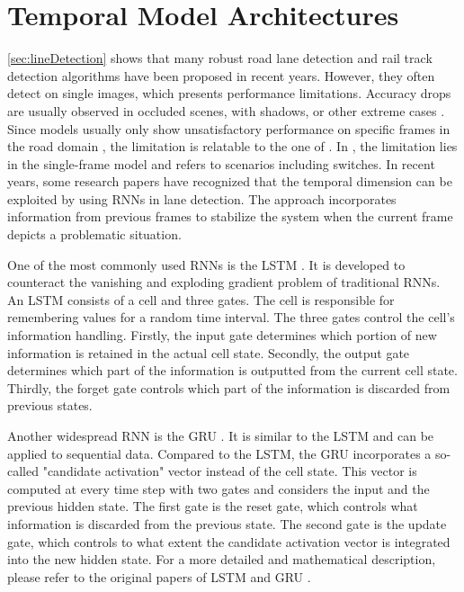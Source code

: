 \section{Temporal Model Architectures}
\label{sec:temporalModelArchitecture}

\autoref{sec:lineDetection} shows that many robust road lane detection and rail track detection algorithms have been proposed in recent years.
However, they often detect on single images, which presents performance limitations.
Accuracy drops are usually observed in occluded scenes, with shadows, or other extreme cases \cite{robustLaneDetection2020}.
Since models usually only show unsatisfactory performance on specific frames in the road domain \cite{robustLaneDetection2020}, the limitation is relatable to the one of \cite{tepNet2024}.
In \cite{tepNet2024}, the limitation lies in the single-frame model and refers to scenarios including switches.
In recent years, some research papers have recognized that the temporal dimension can be exploited by using \ac{RNN}s in lane detection.
The approach incorporates information from previous frames to stabilize the system when the current frame depicts a problematic situation.

One of the most commonly used \ac{RNN}s is the \ac{LSTM} \cite{LSTM2014}.
It is developed to counteract the vanishing and exploding gradient problem of traditional \ac{RNN}s.
An \ac{LSTM} consists of a cell and three gates.
The cell is responsible for remembering values for a random time interval.
The three gates control the cell's information handling.
Firstly, the input gate determines which portion of new information is retained in the actual cell state.
Secondly, the output gate determines which part of the information is outputted from the current cell state.
Thirdly, the forget gate controls which part of the information is discarded from previous states.

Another widespread \ac{RNN} is the \ac{GRU} \cite{GRU2014}.
It is similar to the \ac{LSTM} and can be applied to sequential data.
Compared to the \ac{LSTM}, the \ac{GRU} incorporates a so-called "candidate activation" vector instead of the cell state.
This vector is computed at every time step with two gates and considers the input and the previous hidden state.
The first gate is the reset gate, which controls what information is discarded from the previous state.
The second gate is the update gate, which controls to what extent the candidate activation vector is integrated into the new hidden state.
For a more detailed and mathematical description, please refer to the original papers of \ac{LSTM} \cite{LSTM2014} and \ac{GRU} \cite{GRU2014}.

